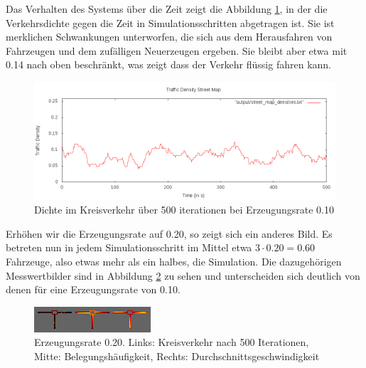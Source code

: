 \documentclass[11pt, a4paper]{article}
\begin{document}
Das Verhalten des Systems über die Zeit zeigt die Abbildung \ref{fig:roundabout010density}, in der die Verkehrsdichte gegen die Zeit in Simulationsschritten abgetragen ist. Sie ist merklichen Schwankungen unterworfen, die sich aus dem Herausfahren von Fahrzeugen und dem zufälligen Neuerzeugen ergeben. Sie bleibt aber etwa mit 0.14 nach oben beschränkt, was zeigt dass der Verkehr flüssig fahren kann.

\begin{figure}[h!]
	\centering
	\includegraphics[width=\textwidth]{img/roundabout_010_densities}
	\caption{Dichte im Kreisverkehr über 500 iterationen bei Erzeugungsrate 0.10}
	\label{fig:roundabout010density}
\end{figure}

Erhöhen wir die Erzeugungsrate auf 0.20, so zeigt sich ein anderes Bild. Es betreten nun in jedem Simulationsschritt im Mittel etwa $3 \cdot 0.20 = 0.60$ Fahrzeuge, also etwas mehr als ein halbes, die Simulation. Die dazugehörigen Messwertbilder sind in Abbildung \ref{fig:roundabout020} zu sehen und unterscheiden sich deutlich von denen für eine Erzeugungsrate von 0.10.

\begin{figure}[h!]
	\centering
	\includegraphics[width=\textwidth]{img/roundabout_020}
	\caption{Erzeugungsrate 0.20. Links: Kreisverkehr nach 500 Iterationen, Mitte: Belegungshäufigkeit, Rechts: Durchschnittsgeschwindigkeit}
	\label{fig:roundabout020}
\end{figure}
\end{document}
